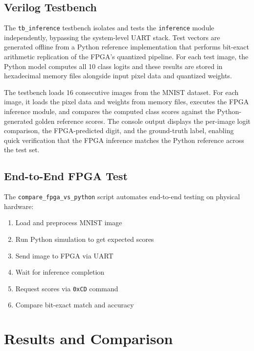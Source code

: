 \documentclass[12pt,a4paper]{report}
\begin{document}
\section{Verilog Testbench}

The \texttt{tb\_inference} testbench isolates and tests the \texttt{inference} module independently, bypassing the system-level UART stack. Test vectors are generated offline from a Python reference implementation that performs bit-exact arithmetic replication of the FPGA's quantized pipeline. For each test image, the Python model computes all 10 class logits and these results are stored in hexadecimal memory files alongside input pixel data and quantized weights.

The testbench loads 16 consecutive images from the MNIST dataset. For each image, it loads the pixel data and weights from memory files, executes the FPGA inference module, and compares the computed class scores against the Python-generated golden reference scores. The console output displays the per-image logit comparison, the FPGA-predicted digit, and the ground-truth label, enabling quick verification that the FPGA inference matches the Python reference across the test set.

\section{End-to-End FPGA Test}

The \texttt{compare\_fpga\_vs\_python} script automates end-to-end testing on physical hardware:

\begin{enumerate}
    \item Load and preprocess MNIST image
    \item Run Python simulation to get expected scores
    \item Send image to FPGA via UART
    \item Wait for inference completion
    \item Request scores via \texttt{0xCD} command
    \item Compare bit-exact match and accuracy
\end{enumerate}

\chapter{Results and Comparison}
\end{document}
